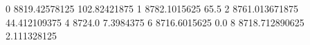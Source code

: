 0 8819.42578125 102.82421875
1 8782.1015625 65.5
2 8761.013671875 44.412109375
4 8724.0 7.3984375
6 8716.6015625 0.0
8 8718.712890625 2.111328125
